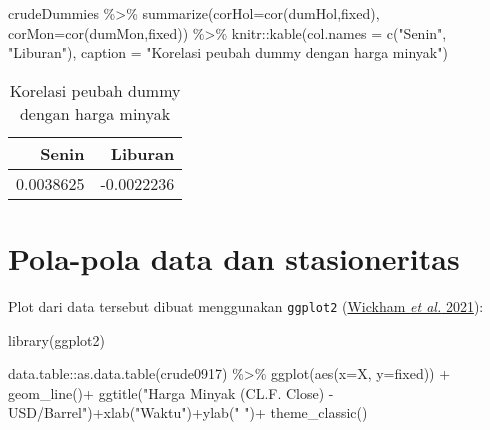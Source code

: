 \documentclass[
]{book}
\newenvironment{Shaded}{\begin{snugshade}}{\end{snugshade}}
\newcommand{\AttributeTok}[1]{\textcolor[rgb]{0.77,0.63,0.00}{#1}}
\newcommand{\FunctionTok}[1]{\textcolor[rgb]{0.00,0.00,0.00}{#1}}
\newcommand{\NormalTok}[1]{#1}
\newcommand{\SpecialCharTok}[1]{\textcolor[rgb]{0.00,0.00,0.00}{#1}}
\newcommand{\StringTok}[1]{\textcolor[rgb]{0.31,0.60,0.02}{#1}}
\begin{document}
\begin{Shaded}
\begin{Highlighting}[]
\NormalTok{crudeDummies }\SpecialCharTok{\%\textgreater{}\%} 
  \FunctionTok{summarize}\NormalTok{(}\AttributeTok{corHol=}\FunctionTok{cor}\NormalTok{(dumHol,fixed),}
            \AttributeTok{corMon=}\FunctionTok{cor}\NormalTok{(dumMon,fixed)) }\SpecialCharTok{\%\textgreater{}\%} 
\NormalTok{  knitr}\SpecialCharTok{::}\FunctionTok{kable}\NormalTok{(}\AttributeTok{col.names =} \FunctionTok{c}\NormalTok{(}\StringTok{"Senin"}\NormalTok{, }\StringTok{"Liburan"}\NormalTok{),}
               \AttributeTok{caption =} \StringTok{"Korelasi peubah dummy dengan harga minyak"}\NormalTok{)}
\end{Highlighting}
\end{Shaded}

\begin{table}

\caption{\label{tab:unnamed-chunk-13}Korelasi peubah dummy dengan harga minyak}
\centering
\begin{tabular}[t]{r|r}
\hline
Senin & Liburan\\
\hline
0.0038625 & -0.0022236\\
\hline
\end{tabular}
\end{table}

\hypertarget{pola-pola-data-dan-stasioneritas}{%
\section{Pola-pola data dan stasioneritas}\label{pola-pola-data-dan-stasioneritas}}

Plot dari data tersebut dibuat menggunakan \texttt{ggplot2} (\protect\hyperlink{ref-R-ggplot2}{Wickham \emph{et al.} 2021}):

\begin{Shaded}
\begin{Highlighting}[]
\FunctionTok{library}\NormalTok{(ggplot2)}

\NormalTok{data.table}\SpecialCharTok{::}\FunctionTok{as.data.table}\NormalTok{(crude0917) }\SpecialCharTok{\%\textgreater{}\%}
  \FunctionTok{ggplot}\NormalTok{(}\FunctionTok{aes}\NormalTok{(}\AttributeTok{x=}\NormalTok{X, }\AttributeTok{y=}\NormalTok{fixed)) }\SpecialCharTok{+}
      \FunctionTok{geom\_line}\NormalTok{()}\SpecialCharTok{+}
      \FunctionTok{ggtitle}\NormalTok{(}\StringTok{"Harga Minyak (CL.F. Close) {-} USD/Barrel"}\NormalTok{)}\SpecialCharTok{+}\FunctionTok{xlab}\NormalTok{(}\StringTok{"Waktu"}\NormalTok{)}\SpecialCharTok{+}\FunctionTok{ylab}\NormalTok{(}\StringTok{" "}\NormalTok{)}\SpecialCharTok{+}
      \FunctionTok{theme\_classic}\NormalTok{()}
\end{Highlighting}
\end{Shaded}
\end{document}
